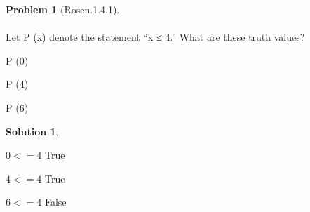 \documentclass{article}
\theoremstyle{definition}
\newtheorem*{problem}{Problem}
\newtheorem*{solution}{Solution}
\begin{document}
\begin{problem}[Rosen.1.4.1]\ \\
\ \\
Let P (x) denote the statement “x ≤ 4.” What are these truth values?\ \\
\begin{compactenum}
\renewcommand{\theenumi}{\alph{enumi}}
\item P (0)
\item P (4) 
\item P (6)
\end{compactenum}
\end{problem}

\begin{solution}\ \\

\begin{compactenum}
\renewcommand{\theenumi}{\alph{enumi}}  
\item $0 <= 4$ True
\item $4 <= 4$ True
\item $6 <= 4$ False





\end{compactenum}
\end{solution}
\end{document}
